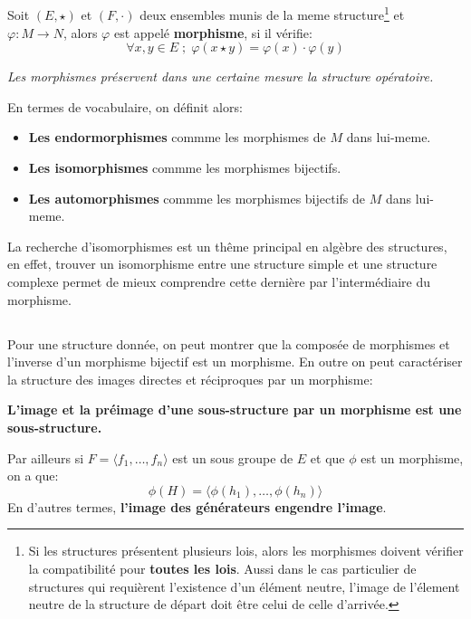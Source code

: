 \subsection*{}
Soit \((E, \star)\) et \((F, \cdot)\)  deux ensembles munis de la meme structure\footnote[1]{Si les structures présentent plusieurs lois, alors les morphismes doivent vérifier la compatibilité pour \textbf{toutes les lois}. Aussi dans le cas particulier de structures qui requièrent l'existence d'un élément neutre, l'image de l'élement neutre de la structure de départ doit être celui de celle d'arrivée.} et \(\varphi: M \rightarrow N\), alors \(\varphi\) est appelé \textbf{morphisme}, si il vérifie:
\[ 
   \forall x, y \in E \; ; \; \varphi(x \star y) = \varphi(x) \cdot \varphi(y)
\]
\begin{center}
   \textit{Les morphismes préservent dans une certaine mesure la structure opératoire.}
\end{center}
En termes de vocabulaire, on définit alors: 
\begin{itemize}
   \item \textbf{Les endormorphismes} commme les morphismes de \(M\) dans lui-meme.
   \item \textbf{Les isomorphismes} commme les morphismes bijectifs.
   \item \textbf{Les automorphismes} commme les morphismes bijectifs de \(M\) dans lui-meme.
\end{itemize}
La recherche d'isomorphismes est un thême principal en algèbre des structures, en effet, trouver un isomorphisme entre une structure simple et une structure complexe permet de mieux comprendre cette dernière par l'intermédiaire du morphisme.
\subsection*{}
Pour une structure donnée, on peut montrer que la composée de morphismes et l'inverse d'un morphisme bijectif est un morphisme. En outre on peut caractériser la structure des images directes et réciproques par un morphisme:
\begin{center}
   \textbf{L'image et la préimage d'une sous-structure par un morphisme est une sous-structure.}
\end{center}
Par ailleurs si \( F = \langle f_1, \ldots, f_n \rangle \) est un sous groupe de \( E \) et que \( \phi \) est un morphisme, on a que:
\[ 
   \phi(H) = \langle \phi(h_1), \ldots, \phi(h_n) \rangle
\]
En d'autres termes, \textbf{l'image des générateurs engendre l'image}.
